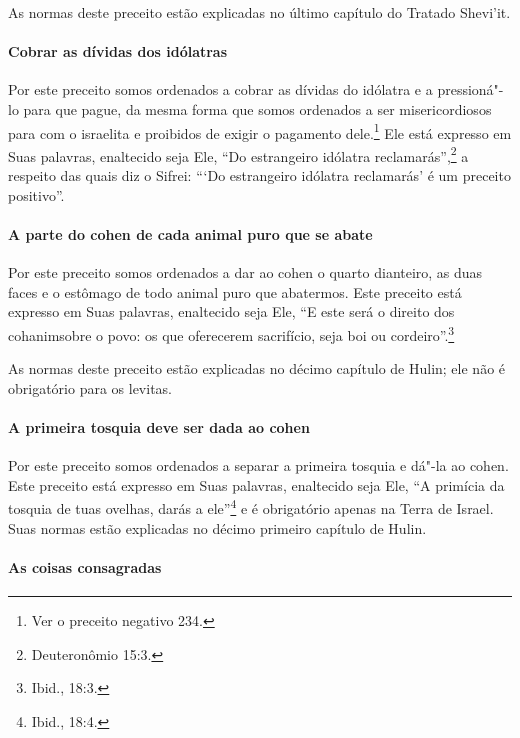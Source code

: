 \begin{multicols}{2}
As normas deste preceito estão explicadas no último capítulo do Tratado
Shevi'it\starr.

\paragraph{Cobrar as dívidas dos idólatras}

Por este preceito somos ordenados a cobrar as dívidas do idólatra e a
pressioná"-lo para que pague, da mesma forma que somos ordenados a ser
misericordiosos para com o israelita e proibidos de exigir o pagamento
dele.\footnote{Ver o preceito negativo 234.} Ele está expresso em Suas palavras,
enaltecido seja Ele, ``Do estrangeiro idólatra reclamarás'',\footnote{Deuteronômio 15:3.} a respeito das quais diz o Sifrei\starr: ```Do
estrangeiro idólatra reclamarás' é um preceito positivo''.

\paragraph{A parte do cohen\starr{} de cada animal puro que se abate}

Por este preceito somos ordenados a dar ao cohen\starr{} o quarto
dianteiro, as duas faces e o estômago de todo animal puro que
abatermos. Este preceito está expresso em Suas palavras, enaltecido
seja Ele, ``E este será o direito dos cohanim\starr sobre o povo: os que
oferecerem sacrifício, seja boi ou cordeiro''.\footnote{Ibid., 18:3.}

As normas deste preceito estão explicadas no décimo capítulo de Hulin\starr;
ele não é obrigatório para os levitas\starr.

\paragraph{A primeira tosquia deve ser dada ao cohen\starr{}}

Por este preceito somos ordenados a separar a primeira tosquia e dá"-la
ao cohen\starr. Este preceito está expresso em Suas palavras, enaltecido
seja Ele, ``A primícia da tosquia de tuas ovelhas, darás a ele''\footnote{Ibid., 18:4.} e é obrigatório apenas na Terra de Israel. Suas
normas estão explicadas no décimo primeiro capítulo de Hulin\starr.

\paragraph{As coisas consagradas}


\end{multicols}
